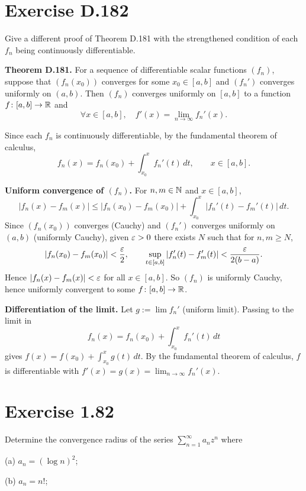 \documentclass{article}
\begin{document}
\section{Exercise D.182}

Give a different proof of Theorem D.181 with the
strengthened condition of each $f_n$ being continuously
differentiable.

\textbf{Theorem D.181.}
For a sequence of differentiable scalar functions $(f_n)$,
suppose that $(f_n(x_0))$ converges for some $x_0 \in [a,b]$
and $(f_n')$ converges uniformly on $(a,b)$.
Then $(f_n)$ converges uniformly on $[a,b]$ to a function
$f \colon [a,b] \to \mathbb{R}$ and
\[
  \forall x \in [a,b],\quad f'(x) = \lim_{n \to \infty} f_n'(x).
\]

\begin{solution}
  Since each $f_n$ is continuously differentiable, by the
  fundamental theorem of calculus,
  \[
    f_n(x) = f_n(x_0) + \int_{x_0}^x f_n'(t)\,dt,
    \qquad x \in [a,b].
  \]

  \textbf{Uniform convergence of $(f_n)$.}\;
  For $n, m \in \mathbb{N}$ and $x \in [a,b]$,
  \[
    |f_n(x) - f_m(x)|
    \le |f_n(x_0) - f_m(x_0)|
    + \int_{x_0}^x |f_n'(t) - f_m'(t)|\,dt.
  \]
  Since $(f_n(x_0))$ converges (Cauchy) and $(f_n')$ converges
  uniformly on $(a,b)$ (uniformly Cauchy), given $\varepsilon > 0$
  there exists $N$ such that for $n,m \ge N$,
  \[
    |f_n(x_0) - f_m(x_0)| < \frac{\varepsilon}{2},
    \qquad
    \sup_{t \in [a,b]} |f_n'(t) - f_m'(t)|
    < \frac{\varepsilon}{2(b-a)}.
  \]
  Hence $|f_n(x) - f_m(x)| < \varepsilon$ for all $x \in [a,b]$.
  So $(f_n)$ is uniformly Cauchy, hence uniformly convergent
  to some $f \colon [a,b] \to \mathbb{R}$.

  \textbf{Differentiation of the limit.}\;
  Let $g := \lim f_n'$ (uniform limit).  Passing to the limit in
  \[
    f_n(x) = f_n(x_0) + \int_{x_0}^x f_n'(t)\,dt
  \]
  gives $f(x) = f(x_0) + \int_{x_0}^x g(t)\,dt$.
  By the fundamental theorem of calculus, $f$ is differentiable
  with $f'(x) = g(x) = \lim_{n\to\infty} f_n'(x)$.\qedhere
\end{solution}

\section{Exercise 1.82}

Determine the convergence radius of the series
$\sum_{n=1}^{\infty} a_n z^n$ where

(a) $a_n = (\log n)^2$;

(b) $a_n = n!$;
\end{document}
